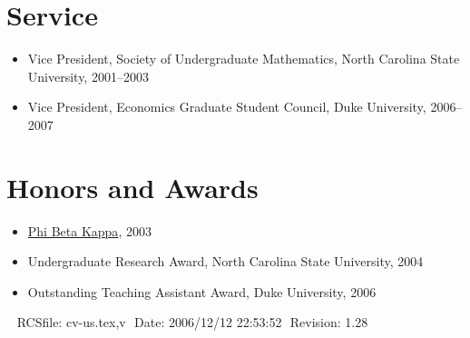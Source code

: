 \documentclass[overlapped,line,letterpaper]{res}
\begin{document}
\begin{resume}

%


\section{\bf Service}

\begin{itemize}
\item Vice President, Society of Undergraduate Mathematics, North
  Carolina State University, 2001--2003
\item Vice President, Economics Graduate Student Council, Duke
  University, 2006--2007
\end{itemize}


\section{\bf Honors and Awards}
\begin{itemize}
\item \href{http://www.pbk.org/}{Phi Beta Kappa}, 2003
\item Undergraduate Research Award, North Carolina State University, 2004
\item Outstanding Teaching Assistant Award, Duke University, 2006
\end{itemize}


\begin{center}
\vspace{\fill}\ \newline
{\tiny \rm $ $RCSfile: cv-us.tex,v $ $ }
{\tiny \rm $ $Date: 2006/12/12 22:53:52 $ $ }
{\tiny \rm $ $Revision: 1.28 $ $ }
\end{center}

\end{resume}
\end{document}
